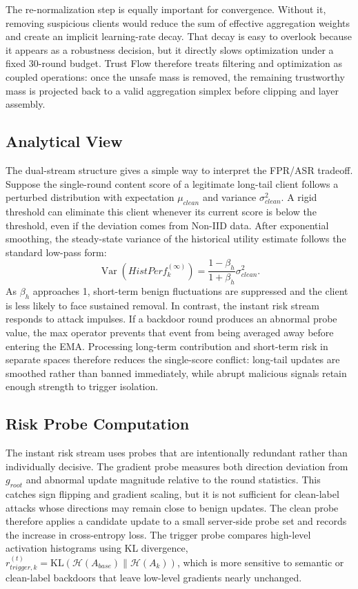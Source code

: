\documentclass[runningheads,orivec]{llncs}
\begin{document}
The re-normalization step is equally important for convergence. Without it, removing suspicious clients would reduce the sum of effective aggregation weights and create an implicit learning-rate decay. That decay is easy to overlook because it appears as a robustness decision, but it directly slows optimization under a fixed 30-round budget. Trust Flow therefore treats filtering and optimization as coupled operations: once the unsafe mass is removed, the remaining trustworthy mass is projected back to a valid aggregation simplex before clipping and layer assembly.

\subsection{Analytical View}

The dual-stream structure gives a simple way to interpret the FPR/ASR tradeoff. Suppose the single-round content score of a legitimate long-tail client follows a perturbed distribution with expectation $\mu_{clean}$ and variance $\sigma_{clean}^2$. A rigid threshold can eliminate this client whenever its current score is below the threshold, even if the deviation comes from Non-IID data. After exponential smoothing, the steady-state variance of the historical utility estimate follows the standard low-pass form:
\begin{equation}
    \operatorname{Var}(HistPerf_k^{(\infty)})=\frac{1-\beta_h}{1+\beta_h}\sigma_{clean}^2 .
\end{equation}
As $\beta_h$ approaches 1, short-term benign fluctuations are suppressed and the client is less likely to face sustained removal. In contrast, the instant risk stream responds to attack impulses. If a backdoor round produces an abnormal probe value, the max operator prevents that event from being averaged away before entering the EMA. Processing long-term contribution and short-term risk in separate spaces therefore reduces the single-score conflict: long-tail updates are smoothed rather than banned immediately, while abrupt malicious signals retain enough strength to trigger isolation.

\subsection{Risk Probe Computation}

The instant risk stream uses probes that are intentionally redundant rather than individually decisive. The gradient probe measures both direction deviation from $g_{root}$ and abnormal update magnitude relative to the round statistics. This catches sign flipping and gradient scaling, but it is not sufficient for clean-label attacks whose directions may remain close to benign updates. The clean probe therefore applies a candidate update to a small server-side probe set and records the increase in cross-entropy loss. The trigger probe compares high-level activation histograms using KL divergence, $r_{trigger,k}^{(t)}=\mathrm{KL}(\mathcal{H}(A_{base})\|\mathcal{H}(A_k))$, which is more sensitive to semantic or clean-label backdoors that leave low-level gradients nearly unchanged.
\end{document}
